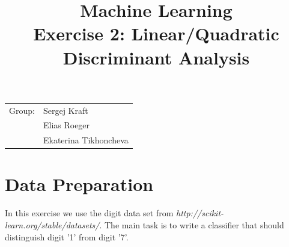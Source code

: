 \documentclass{article}
\title{Machine Learning \\ \bf{Exercise 2: Linear/Quadratic Discriminant Analysis} } %
\begin{document}
\maketitle

\begin{center}
\begin{tabular}{l l}
Group: &  Sergej Kraft \\
       & Elias Roeger \\
       & Ekaterina Tikhoncheva \\ 
\end{tabular}
\end{center}

\tableofcontents

\section{Data Preparation}

In this exercise we use the digit data set from {\it http://scikit-learn.org/stable/datasets/}.
The main task is to write a classifier that should distinguish digit '1' from digit '7'. 
\end{document}
